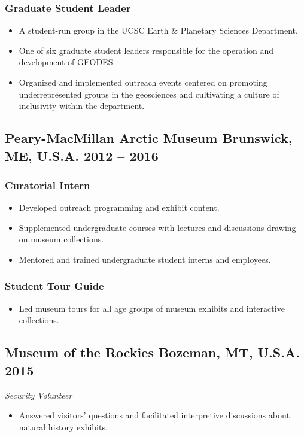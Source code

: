 \subsubsection*{Graduate Student Leader}
\begin{itemize}
	\item A student-run group in the UCSC Earth \& Planetary Sciences Department.
	\item One of six graduate student leaders responsible for the operation and development of GEODES.
	\item Organized and implemented outreach events centered on promoting underrepresented groups in the geosciences and cultivating a culture of inclusivity within the department.
\end{itemize}

\subsection*{\textbf{Peary-MacMillan Arctic Museum} \hspace{15pt} Brunswick, ME, U.S.A. \hfill 2012 -- 2016}
\subsubsection*{Curatorial Intern }
\begin{itemize}
	\item Developed outreach programming and exhibit content.
	\item Supplemented undergraduate courses with lectures and discussions drawing on museum collections.
	\item Mentored and trained undergraduate student interns and employees.
\end{itemize}

\subsubsection*{Student Tour Guide }
\begin{itemize}
	\item Led museum tours for all age groups of museum exhibits and interactive collections.
\end{itemize}

\subsection*{\textbf{Museum of the Rockies} \hspace{15pt} Bozeman, MT, U.S.A. \hfill 2015}
\textit{Security Volunteer}
\begin{itemize}
	\item Answered visitors' questions and facilitated interpretive discussions about natural history exhibits.
\end{itemize}